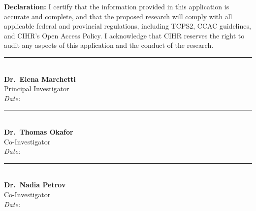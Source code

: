 \vspace{8pt}
\begin{tcolorbox}[
  enhanced,
  colback=cihrNavy,
  colframe=cihrNavy,
  sharp corners,
  left=8pt, right=8pt, top=8pt, bottom=8pt,
  parbox=false
]
  \fontsize{8}{10}\selectfont\color{white}
  \textbf{Declaration:} I certify that the information provided in this application is accurate and complete, and that the proposed research will comply with all applicable federal and provincial regulations, including TCPS2, CCAC guidelines, and CIHR's Open Access Policy. I acknowledge that CIHR reserves the right to audit any aspects of this application and the conduct of the research.

  \vspace{8pt}
  \begin{minipage}[t]{0.32\linewidth}
    \centering
    \textcolor{cihrGold}{\rule{4cm}{0.5pt}}\\[2pt]
    \textbf{Dr.\ Elena Marchetti}\\
    Principal Investigator\\
    \textit{Date: \underline{\hspace{2.5cm}}}
  \end{minipage}%
  \hfill
  \begin{minipage}[t]{0.32\linewidth}
    \centering
    \textcolor{cihrGold}{\rule{4cm}{0.5pt}}\\[2pt]
    \textbf{Dr.\ Thomas Okafor}\\
    Co-Investigator\\
    \textit{Date: \underline{\hspace{2.5cm}}}
  \end{minipage}%
  \hfill
  \begin{minipage}[t]{0.32\linewidth}
    \centering
    \textcolor{cihrGold}{\rule{4cm}{0.5pt}}\\[2pt]
    \textbf{Dr.\ Nadia Petrov}\\
    Co-Investigator\\
    \textit{Date: \underline{\hspace{2.5cm}}}
  \end{minipage}
\end{tcolorbox}
